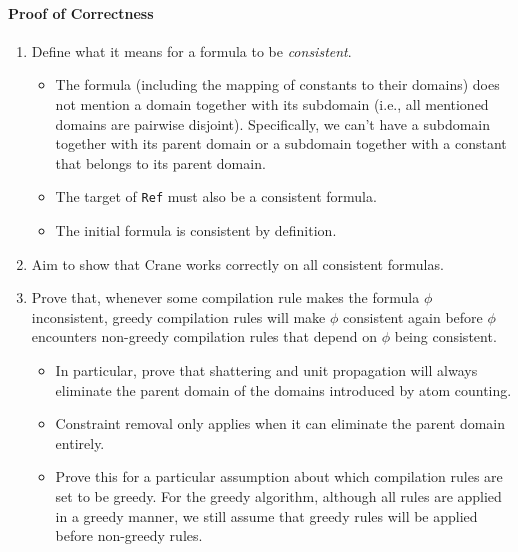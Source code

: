 \documentclass{article}
\begin{document}
\paragraph{Proof of Correctness}
\begin{enumerate}
  \item Define what it means for a formula to be \emph{consistent}.
        \begin{itemize}
          \item The formula (including the mapping of constants to their
                domains) does not mention a domain together with its subdomain
                (i.e., all mentioned domains are pairwise disjoint).
                Specifically, we can't have a subdomain together with its parent
                domain or a subdomain together with a constant that belongs to
                its parent domain.
          \item The target of \texttt{Ref} must also be a consistent formula.
          \item The initial formula is consistent by definition.
        \end{itemize}
  \item Aim to show that Crane works correctly on all consistent formulas.
  \item Prove that, whenever some compilation rule makes the formula $\phi$
        inconsistent, greedy compilation rules will make $\phi$ consistent again
        before $\phi$ encounters non-greedy compilation rules that depend on
        $\phi$ being consistent.
        \begin{itemize}
          \item In particular, prove that shattering and unit propagation will
                always eliminate the parent domain of the domains introduced by
                atom counting.
          \item Constraint removal only applies when it can eliminate the parent
                domain entirely.
          \item Prove this for a particular assumption about which compilation
                rules are set to be greedy. For the greedy algorithm, although
                all rules are applied in a greedy manner, we still assume that
                greedy rules will be applied before non-greedy rules.
        \end{itemize}
  \end{enumerate}
\end{document}
